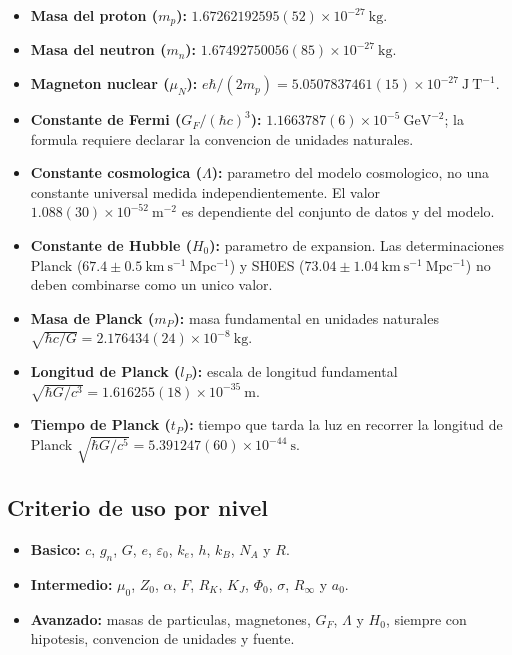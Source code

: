 \documentclass[11pt,a4paper]{article}
\begin{document}
\begin{itemize}
  \item \textbf{Masa del proton ($m_p$):} $1.67262192595(52)\times10^{-27}\ \mathrm{kg}$.
  \item \textbf{Masa del neutron ($m_n$):} $1.67492750056(85)\times10^{-27}\ \mathrm{kg}$.
  \item \textbf{Magneton nuclear ($\mu_N$):} $e\hbar/(2m_p)=5.0507837461(15)\times10^{-27}\ \mathrm{J\ T^{-1}}$.
  \item \textbf{Constante de Fermi ($G_F/(\hbar c)^3$):} $1.1663787(6)\times10^{-5}\ \mathrm{GeV^{-2}}$; la formula requiere declarar la convencion de unidades naturales.
  \item \textbf{Constante cosmologica ($\Lambda$):} parametro del modelo cosmologico, no una constante universal medida independientemente. El valor $1.088(30)\times10^{-52}\ \mathrm{m^{-2}}$ es dependiente del conjunto de datos y del modelo.
  \item \textbf{Constante de Hubble ($H_0$):} parametro de expansion. Las determinaciones Planck ($67.4\pm0.5\ \mathrm{km\ s^{-1}\ Mpc^{-1}}$) y SH0ES ($73.04\pm1.04\ \mathrm{km\ s^{-1}\ Mpc^{-1}}$) no deben combinarse como un unico valor.
  \item \textbf{Masa de Planck ($m_P$):} masa fundamental en unidades naturales $\sqrt{\hbar c / G} = 2.176434(24)\times10^{-8}\ \mathrm{kg}$.
  \item \textbf{Longitud de Planck ($l_P$):} escala de longitud fundamental $\sqrt{\hbar G / c^3} = 1.616255(18)\times10^{-35}\ \mathrm{m}$.
  \item \textbf{Tiempo de Planck ($t_P$):} tiempo que tarda la luz en recorrer la longitud de Planck $\sqrt{\hbar G / c^5} = 5.391247(60)\times10^{-44}\ \mathrm{s}$.
\end{itemize}

\subsection*{Criterio de uso por nivel}

\begin{itemize}
  \item \textbf{Basico:} $c$, $g_n$, $G$, $e$, $\varepsilon_0$, $k_e$, $h$, $k_B$, $N_A$ y $R$.
  \item \textbf{Intermedio:} $\mu_0$, $Z_0$, $\alpha$, $F$, $R_K$, $K_J$, $\Phi_0$, $\sigma$, $R_\infty$ y $a_0$.
  \item \textbf{Avanzado:} masas de particulas, magnetones, $G_F$, $\Lambda$ y $H_0$, siempre con hipotesis, convencion de unidades y fuente.
\end{itemize}
\end{document}
